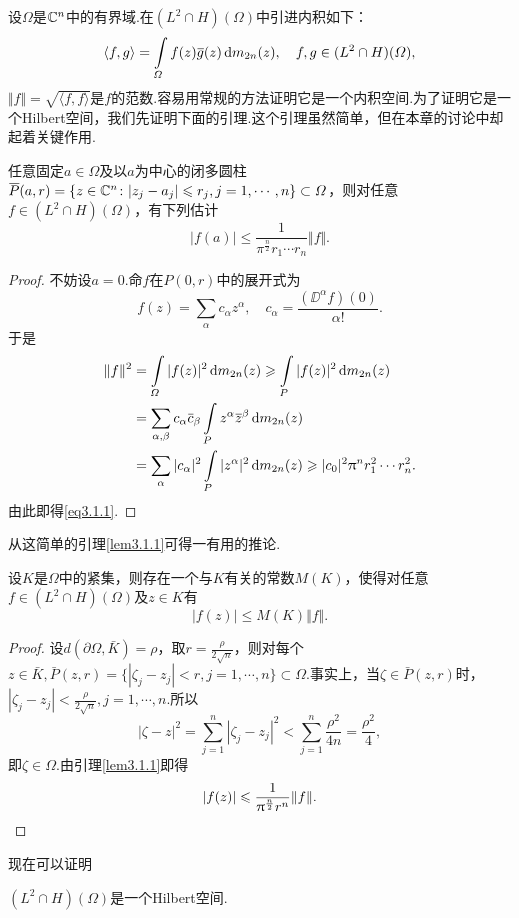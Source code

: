设$\Omega$是$\MC^n$中的有界域.在$(L^2\cap H)(\Omega)$中引进内积如下：
\[\langle f,g\rangle=\int\limits_{\Omega}f(z)\bar{g}(z)\dif m_{2n}(z),\quad f,g\in(L^2\cap H)(\Omega),\]
$\Vert f\Vert=\sqrt{\langle f,f\rangle}$是$f$的范数.容易用常规的方法证明它是一个内积空间.为了证明它是一个Hilbert空间，我们先证明下面的引理.这个引理虽然简单，但在本章的讨论中却起着关键作用.
\begin{lemma}\label{lem3.1.1}
	任意固定$a\in\Omega$及以$a$为中心的闭多圆柱$\bar{P}(a,r)=\{z\in\MC^n\colon|z_j-a_j|\le r_j,j=1,\cdots,n\}\subset\Omega$，则对任意$f\in(L^2\cap H)(\Omega)$，有下列估计
	\begin{equation}\label{eq3.1.1}
		|f(a)|\le\frac1{\pi^{\frac{n}2}r_1\cdots r_n}\Vert f\Vert.
	\end{equation}
\end{lemma}
\begin{proof}
	不妨设$a=0$.命$f$在$P(0,r)$中的展开式为
	\[f(z)=\sum_\alpha c_\alpha z^\alpha,\quad c_\alpha=\frac{(\DD^\alpha f)(0)}{\alpha!}.\]
	于是
	\begin{align*}
		\Vert f\Vert^2
		&=\int\limits_\Omega |f(z)|^2 \dif m_{2n}(z)\ge\int\limits_P |f(z)|^2 \dif m_{2n}(z)\\
		&=\sum_{\alpha,\beta} c_\alpha \bar{c}_\beta\int\limits_P z^\alpha\bar{z}^\beta \dif m_{2n}(z)\\
		&=\sum_\alpha |c_\alpha|^2 \int\limits_P |z^\alpha|^2 \dif m_{2n}(z)\ge |c_0|^2 \pi^n r_1^2\cdots r_n^2.
	\end{align*}
由此即得\eqref{eq3.1.1}.
\end{proof}
从这简单的引理\ref{lem3.1.1}可得一有用的推论.
\begin{corollary}\label{cor3.1.2}
	设$K$是$\Omega$中的紧集，则存在一个与$K$有关的常数$M(K)$，使得对任意$f\in(L^2\cap H)(\Omega)$及$z\in K$有
	\[|f(z)|\le M(K)\Vert f\Vert.\]
\end{corollary}
\begin{proof}
	设$d(\partial\Omega,\bar{K})=\rho$，取$r=\frac{\rho}{2\sqrt{n}}$，则对每个$z\in\bar{K},\bar{P}(z,r)=\{|\zeta_j-z_j|<r,j=1,\cdots,n\}\subset\Omega$.事实上，当$\zeta\in\bar{P}(z,r)$时，$|\zeta_j-z_j|<\frac{\rho}{2\sqrt{n}},j=1,\cdots,n$.所以
	\[|\zeta-z|^2=\sum_{j=1}^{n}|\zeta_j-z_j|^2<\sum_{j=1}^{n}\frac{\rho^2}{4n}=\frac{\rho^2}{4},\]
	即$\zeta\in\Omega$.由引理\ref{lem3.1.1}即得
	\[|f(z)|\le\frac{1}{\pi^{\frac n2}r^n}\Vert f\Vert.\qedhere\]
\end{proof}
现在可以证明
\begin{theorem}\label{thm3.1.3}
	$(L^2\cap H)(\Omega)$是一个Hilbert空间.
\end{theorem}
